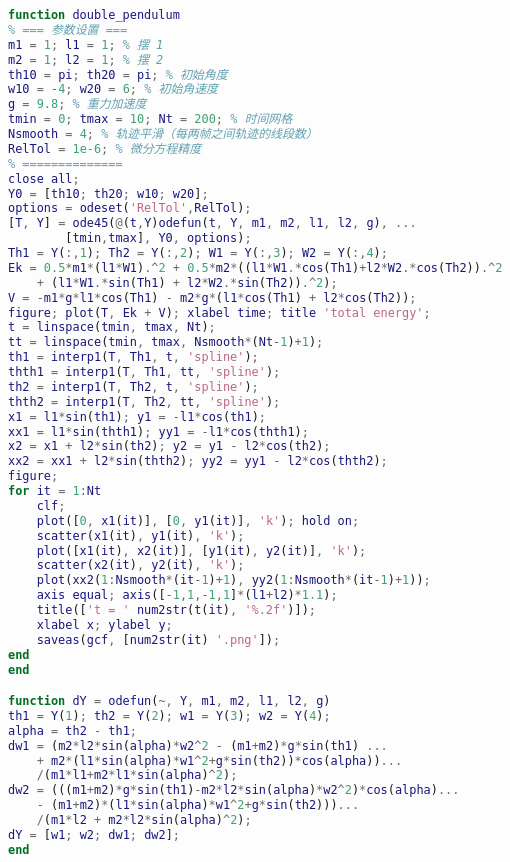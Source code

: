 \begin{lstlisting}[language=matlab, caption=double_pendulum.m]
% 双摆运动
function double_pendulum
% === 参数设置 ===
m1 = 1; l1 = 1; % 摆 1
m2 = 1; l2 = 1; % 摆 2
th10 = pi; th20 = pi; % 初始角度
w10 = -4; w20 = 6; % 初始角速度
g = 9.8; % 重力加速度
tmin = 0; tmax = 10; Nt = 200; % 时间网格
Nsmooth = 4; % 轨迹平滑（每两帧之间轨迹的线段数）
RelTol = 1e-6; % 微分方程精度
% ==============
close all;
Y0 = [th10; th20; w10; w20];
options = odeset('RelTol',RelTol);
[T, Y] = ode45(@(t,Y)odefun(t, Y, m1, m2, l1, l2, g), ...
        [tmin,tmax], Y0, options);
Th1 = Y(:,1); Th2 = Y(:,2); W1 = Y(:,3); W2 = Y(:,4);
Ek = 0.5*m1*(l1*W1).^2 + 0.5*m2*((l1*W1.*cos(Th1)+l2*W2.*cos(Th2)).^2 ...
    + (l1*W1.*sin(Th1) + l2*W2.*sin(Th2)).^2);
V = -m1*g*l1*cos(Th1) - m2*g*(l1*cos(Th1) + l2*cos(Th2));
figure; plot(T, Ek + V); xlabel time; title 'total energy';
t = linspace(tmin, tmax, Nt);
tt = linspace(tmin, tmax, Nsmooth*(Nt-1)+1);
th1 = interp1(T, Th1, t, 'spline');
thth1 = interp1(T, Th1, tt, 'spline');
th2 = interp1(T, Th2, t, 'spline');
thth2 = interp1(T, Th2, tt, 'spline');
x1 = l1*sin(th1); y1 = -l1*cos(th1);
xx1 = l1*sin(thth1); yy1 = -l1*cos(thth1);
x2 = x1 + l2*sin(th2); y2 = y1 - l2*cos(th2);
xx2 = xx1 + l2*sin(thth2); yy2 = yy1 - l2*cos(thth2);
figure;
for it = 1:Nt
    clf;
    plot([0, x1(it)], [0, y1(it)], 'k'); hold on;
    scatter(x1(it), y1(it), 'k');
    plot([x1(it), x2(it)], [y1(it), y2(it)], 'k');
    scatter(x2(it), y2(it), 'k');
    plot(xx2(1:Nsmooth*(it-1)+1), yy2(1:Nsmooth*(it-1)+1));
    axis equal; axis([-1,1,-1,1]*(l1+l2)*1.1);
    title(['t = ' num2str(t(it), '%.2f')]);
    xlabel x; ylabel y;
    saveas(gcf, [num2str(it) '.png']);
end
end

function dY = odefun(~, Y, m1, m2, l1, l2, g)
th1 = Y(1); th2 = Y(2); w1 = Y(3); w2 = Y(4);
alpha = th2 - th1;
dw1 = (m2*l2*sin(alpha)*w2^2 - (m1+m2)*g*sin(th1) ...
    + m2*(l1*sin(alpha)*w1^2+g*sin(th2))*cos(alpha))...
    /(m1*l1+m2*l1*sin(alpha)^2);
dw2 = (((m1+m2)*g*sin(th1)-m2*l2*sin(alpha)*w2^2)*cos(alpha)...
    - (m1+m2)*(l1*sin(alpha)*w1^2+g*sin(th2)))...
    /(m1*l2 + m2*l2*sin(alpha)^2);
dY = [w1; w2; dw1; dw2];
end
\end{lstlisting}

